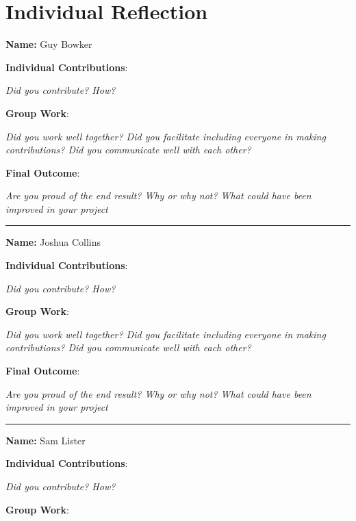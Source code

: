 \documentclass[report.tex]{subfiles}
\begin{document}
\section{Individual Reflection}

\noindent \textbf{Name:} Guy Bowker \newline

\noindent \textbf{Individual Contributions}:

\noindent \emph{Did you contribute? How?} \newline

\noindent \textbf{Group Work}:

\noindent \emph{Did you work well together? Did you facilitate including everyone in making contributions? Did you communicate well with each other?} \newline

\noindent \textbf{Final Outcome}:

\noindent \emph{Are you proud of the end result? Why or why not? What could have been improved in your project} \newline

\noindent\rule{17cm}{0.4pt}

\noindent \textbf{Name:} Joshua Collins \newline

\noindent \textbf{Individual Contributions}:

\noindent \emph{Did you contribute? How?} \newline

\noindent \textbf{Group Work}:

\noindent \emph{Did you work well together? Did you facilitate including everyone in making contributions? Did you communicate well with each other?} \newline

\noindent \textbf{Final Outcome}:

\noindent \emph{Are you proud of the end result? Why or why not? What could have been improved in your project} \newline

\noindent\rule{17cm}{0.4pt}

\noindent \textbf{Name:} Sam Lister \newline

\noindent \textbf{Individual Contributions}:

\noindent \emph{Did you contribute? How?} \newline

\noindent \textbf{Group Work}:
\end{document}
